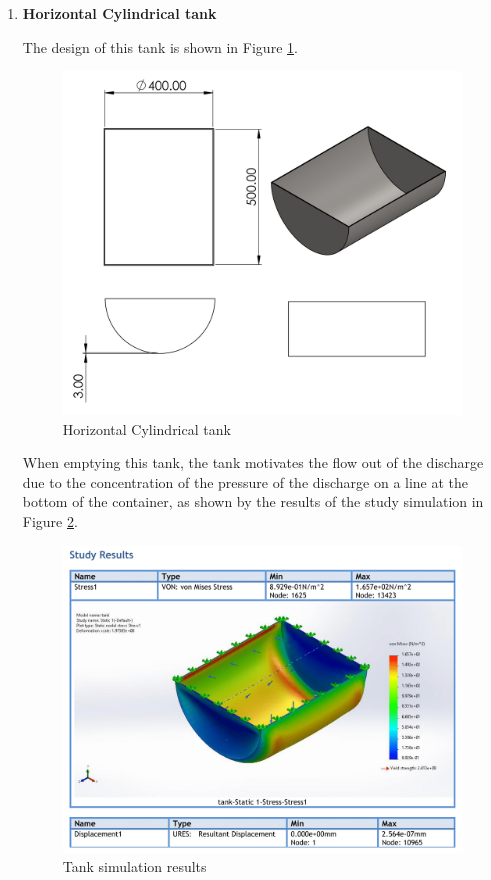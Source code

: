 \begin{itemize}
\begin{enumerate}
    \item \textbf{Horizontal Cylindrical tank}
    \par
    The design of this tank is shown in Figure \ref{fig:horizontal_cylindrical_tank}.
    \begin{figure}[H]
        \centering
        \includegraphics{Figures/tank2.PNG}
        \caption{Horizontal Cylindrical tank}
        \label{fig:horizontal_cylindrical_tank}
    \end{figure}
    When emptying this tank, the tank motivates the flow out of the discharge due to the concentration of the pressure of the discharge on a line at the bottom of the container, as shown by the results of the study simulation in Figure \ref{fig:tank_simulation_results}.
    \begin{figure}[H]
        \centering
        \includegraphics[width=\textwidth]{Figures/tank-Static-1-1-1.png}
        \caption{Tank simulation results}
        \label{fig:tank_simulation_results}
    \end{figure}
\end{enumerate}


\end{itemize}
